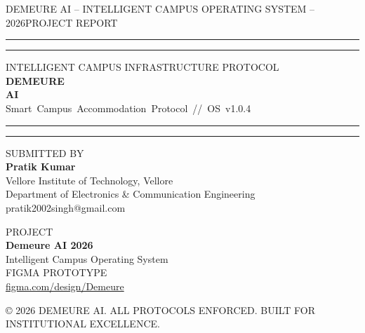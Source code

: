 \documentclass[12pt, a4paper]{article}
\begin{document}
\begin{titlepage}
  \pagecolor{dink}

  \vspace*{1.2cm}
  {\color{dslate}\ttfamily\footnotesize DEMEURE AI -- INTELLIGENT CAMPUS OPERATING SYSTEM -- 2026\hfill PROJECT REPORT}
  \vspace{0.4cm}
  {\color{dnavy}\rule{\linewidth}{0.5pt}}
  \vspace{0.3cm}
  {\color{dbluedim}\rule{\linewidth}{0.3pt}}

  \vspace{2.8cm}
  \begin{center}
    {\color{dslate}\ttfamily\tiny INTELLIGENT CAMPUS INFRASTRUCTURE PROTOCOL}\\[0.6cm]
    {\fontsize{72}{78}\selectfont\bfseries\color{white} DEMEURE}\\[0pt]
    {\fontsize{72}{78}\selectfont\bfseries\color{dblue} AI}\\[1.2cm]
    {\color{dslate}\ttfamily\small Smart~Campus~Accommodation~Protocol~//~OS~v1.0.4}
  \end{center}

  \vfill

  {\color{dbluedim}\rule{\linewidth}{0.3pt}}
  \vspace{0.3cm}
  {\color{dnavy}\rule{\linewidth}{0.5pt}}
  \vspace{0.5cm}

  \begin{minipage}[t]{0.55\linewidth}
    {\color{dslate}\ttfamily\tiny SUBMITTED BY}\\[0.25cm]
    {\color{white}\large\bfseries Pratik Kumar}\\[0.15cm]
    {\color{dslate}\small Vellore Institute of Technology, Vellore}\\[0.05cm]
    {\color{dslate}\small Department of Electronics \& Communication Engineering}\\[0.05cm]
    {\color{dblue}\small\ttfamily pratik2002singh@gmail.com}
  \end{minipage}
  \hfill
  \begin{minipage}[t]{0.38\linewidth}\raggedleft
    {\color{dslate}\ttfamily\tiny PROJECT}\\[0.25cm]
    {\color{white}\bfseries Demeure AI 2026}\\[0.05cm]
    {\color{dslate}\small Intelligent Campus Operating System}\\[0.3cm]
    {\color{dslate}\ttfamily\tiny FIGMA PROTOTYPE}\\[0.15cm]
    {\color{dblue}\small\ttfamily\href{https://www.figma.com/design/S0tmUfP9rU54l6yEuYej26/Demeure?node-id=150-41}{figma.com/design/Demeure}}
  \end{minipage}

  \vspace{1cm}
  {\color{dslate}\ttfamily\tiny © 2026 DEMEURE AI. ALL PROTOCOLS ENFORCED. BUILT FOR INSTITUTIONAL EXCELLENCE.}
\end{titlepage}
\end{document}
